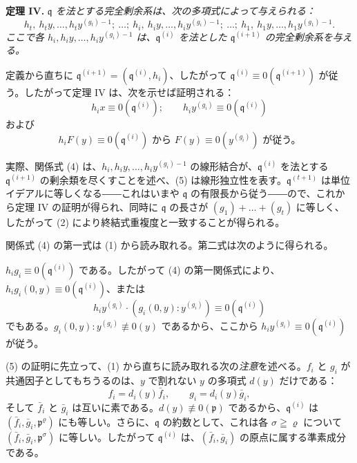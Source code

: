 \textbf{定理 IV.} \emph{\(\mathfrak{q}\) を法とする完全剰余系は、次の多項式によって与えられる：}
\[
h_t,\ h_ty,\ldots,h_ty^{(g_t)-1};\ \ldots;\
h_i,\ h_iy,\ldots,h_iy^{(g_i)-1};\ \ldots;\
h_1,\ h_1y,\ldots,h_1y^{(g_1)-1}.
\]
\emph{ここで各 \(h_i,h_iy,\ldots,h_iy^{(g_i)-1}\) は、\(\mathfrak{q}^{(i)}\) を法とした \(\mathfrak{q}^{(i+1)}\) の完全剰余系を与える。}

定義から直ちに \(\mathfrak{q}^{(i+1)}=(\mathfrak{q}^{(i)},h_i)\)、したがって \(\mathfrak{q}^{(i)}\equiv0(\mathfrak{q}^{(i+1)})\) が従う。したがって定理 IV は、次を示せば証明される：
\begin{equation}
\tag{4}
h_i x\equiv0(\mathfrak{q}^{(i)});\qquad
h_i y^{(g_i)}\equiv0(\mathfrak{q}^{(i)})
\end{equation}
および
\begin{equation}
\tag{5}
 h_iF(y)\equiv0(\mathfrak{q}^{(i)})
 \text{ から }F(y)\equiv0(y^{(g_i)})\text{ が従う。}
\end{equation}

実際、関係式 (4) は、\(h_i,h_iy,\ldots,h_iy^{(g_i)-1}\) の線形結合が、\(\mathfrak{q}^{(i)}\) を法とする \(\mathfrak{q}^{(i+1)}\) の剰余類を尽くすことを述べ、(5) は線形独立性を表す。\(\mathfrak{q}^{(t+1)}\) は単位イデアルに等しくなる――これはいまや \(\mathfrak{q}\) の有限長から従う――ので、これから定理 IV の証明が得られ、同時に \(\mathfrak{q}\) の長さが \((g_1)+\ldots+(g_t)\) に等しく、したがって (2) により終結式重複度と一致することが得られる。

関係式 (4) の第一式は (1) から読み取れる。第二式は次のように得られる。

\(h_ig_i\equiv0(\mathfrak{q}^{(i)})\) である。したがって (4) の第一関係式により、\(h_ig_i(0,y)\equiv0(\mathfrak{q}^{(i)})\)、または
\[
h_iy^{(g_i)}\cdot(g_i(0,y):y^{(g_i)})\equiv0(\mathfrak{q}^{(i)})
\]
でもある。\(g_i(0,y):y^{(g_i)}\not\equiv0(y)\) であるから、ここから \(h_iy^{(g_i)}\equiv0(\mathfrak{q}^{(i)})\) が従う。

(5) の証明に先立って、(1) から直ちに読み取れる次の\emph{注意}を述べる。\(f_i\) と \(g_i\) が共通因子としてもちうるのは、\(y\) で割れない \(y\) の多項式 \(d(y)\) だけである：
\[
f_i=d_i(y)\bar f_i,\qquad g_i=d_i(y)\bar g_i,
\]
そして \(\bar f_i\) と \(\bar g_i\) は互いに素である。\(d(y)\not\equiv0(\mathfrak{p})\) であるから、\(\mathfrak{q}^{(i)}\) は \((\bar f_i,\bar g_i,\mathfrak{p}^\varrho)\) にも等しい。さらに、\(\mathfrak{q}\) の約数として、これは各 \(\sigma\geqq\varrho\) について \((\bar f_i,\bar g_i,\mathfrak{p}^\sigma)\) に等しい。したがって \(\mathfrak{q}^{(i)}\) は、\((\bar f_i,\bar g_i)\) の原点に属する準素成分である。

